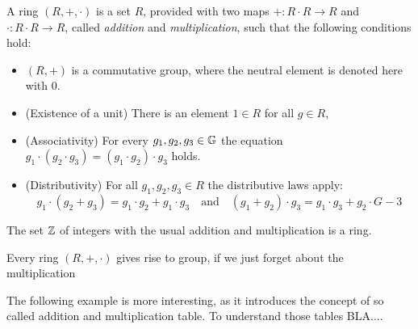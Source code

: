 \begin{definition}
A ring $ (R, +, \cdot) $ is a set $R$, provided with two maps $ +: R \cdot R \to R $ and $ \cdot: R \cdot R \to R $, called \textit{addition} and \textit{multiplication}, such that the following conditions hold:
\begin{itemize}
\item $ \left (R, + \right) $ is a commutative group, where the neutral element is denoted here with $ 0 $.
\item (Existence of a unit) There is an element $1\in R$ for all $g\in R$, 
\item (Associativity) For every $g_1,g_2,g_3\in\mathbb{G}$ the equation 
$g_1\cdot(g_2\cdot g_3) = (g_1\cdot g_2)\cdot g_3$ holds. 
\item (Distributivity) For all $ g_1, g_2, g_3 \in R $ the distributive laws apply:
$$ g_1 \cdot \left (g_2 + g_3 \right) = g_1 \cdot g_2 + g_1 \cdot g_3 \quad \text{and} \quad
\left (g_1 + g_2 \right) \cdot g_3 = g_1 \cdot g_3 + g_2 \cdot G-3 $$
\end{itemize}
\end{definition}
\begin{example} The set $\mathbb{Z}$ of integers with the usual addition and multiplication is a ring.
\end{example}
\begin{example} Every ring $(R,+,\cdot)$ gives rise to group, if we just forget about the multiplication
\end{example}
The following example is more interesting, as it introduces the concept of so called addition and multiplication table. To understand those tables BLA....
